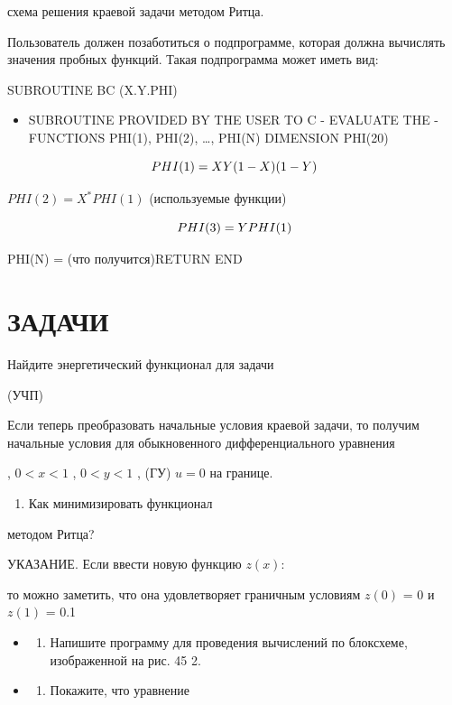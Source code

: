 \documentclass[
  ukrainian,
]{article}
\providecommand{\tightlist}{%
  \setlength{\itemsep}{0pt}\setlength{\parskip}{0pt}}
\begin{document}
схема решения краевой задачи методом Ритца.

Пользователь должен позаботиться о подпрограмме, которая должна
вычислять значения пробных функций. Такая подпрограмма может иметь вид:

SUBROUTINE BC (X.Y.PHI)

\begin{itemize}
\tightlist
\item
  SUBROUTINE PROVIDED BY THE USER TO C - EVALUATE THE - FUNCTIONS
  PHI(1), PHI(2), \ldots, PHI(N) DIMENSION PHI(20)
\end{itemize}

\[
PHI(1) = X\*Y\*(1-X)\*(1-Y)
\]

\(PHI(2) = X^*PHI(1)\) (используемые функции)

\[
PHI(3) = Y\*PHI(1)
\]

PHI(N) = (что получится)RETURN END

\section{\texorpdfstring{\textbf{ЗА}ДАЧИ}{ЗАДАЧИ}}\label{ux437ux430ux434ux430ux447ux438-2}

Найдите энергетический функционал для задачи

(УЧП)

Если теперь преобразовать начальные условия краевой задачи, то получим
начальные условия для обыкновенного дифференциального уравнения

, \(0 < x < 1\) , \(0 < y < 1\) , (ГУ) \(u = 0\) на границе.

\begin{enumerate}
\def\labelenumi{\arabic{enumi}.}
\setcounter{enumi}{1}
\tightlist
\item
  Как минимизировать функционал
\end{enumerate}

методом Ритца?

УКАЗАНИЕ. Если ввести новую функцию \(z(x)\):

то можно заметить, что она удовлетворяет граничным условиям \(z(0)\) = 0
и \(z(1)\) = 0.1

\begin{itemize}
\tightlist
\item
  \begin{enumerate}
  \def\labelenumi{\arabic{enumi}.}
  \setcounter{enumi}{2}
  \tightlist
  \item
    Напишите программу для проведения вычислений по блоксхеме,
    изображенной на рис. 45 2.
  \end{enumerate}
\item
  \begin{enumerate}
  \def\labelenumi{\arabic{enumi}.}
  \setcounter{enumi}{3}
  \tightlist
  \item
    Покажите, что уравнение
  \end{enumerate}
\end{itemize}
\end{document}
